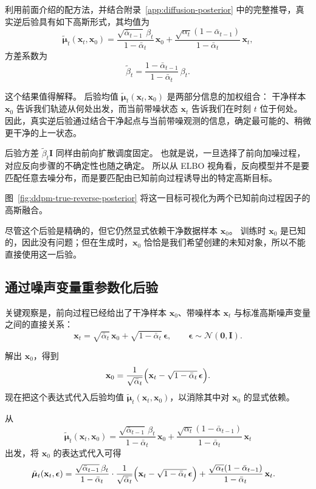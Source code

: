 利用前面介绍的配方法，并结合附录~\ref{app:diffusion-posterior} 中的完整推导，真实逆后验具有如下高斯形式，其均值为
\[
\tilde{\boldsymbol{\mu}}_t(\mathbf{x}_t,\mathbf{x}_0)
=
\frac{
\sqrt{\bar{\alpha}_{t-1}}\,\beta_t
}{
1-\bar{\alpha}_t
}\,\mathbf{x}_0
+
\frac{
\sqrt{\alpha_t}(1-\bar{\alpha}_{t-1})
}{
1-\bar{\alpha}_t
}\,\mathbf{x}_t,
\]
方差系数为
\[
\tilde{\beta}_t
=
\frac{
1-\bar{\alpha}_{t-1}
}{
1-\bar{\alpha}_t
}\,\beta_t.
\]

这个结果值得解释。
后验均值
$\tilde{\boldsymbol{\mu}}_t(\mathbf{x}_t,\mathbf{x}_0)$
是两部分信息的加权组合：
干净样本 $\mathbf{x}_0$ 告诉我们轨迹从何处出发，而当前带噪状态 $\mathbf{x}_t$ 告诉我们在时刻 $t$ 位于何处。
因此，真实逆后验通过结合干净起点与当前带噪观测的信息，确定最可能的、稍微更干净的上一状态。

后验方差 $\tilde{\beta}_t\mathbf{I}$ 同样由前向扩散调度固定。
也就是说，一旦选择了前向加噪过程，对应反向步骤的不确定性也随之确定。
所以从 ELBO 视角看，反向模型并不是要匹配任意去噪分布，而是要匹配由已知前向过程诱导出的特定高斯目标。

图~\ref{fig:ddpm-true-reverse-posterior} 将这一目标可视化为两个已知前向过程因子的高斯融合。



尽管这个后验是精确的，但它仍然显式依赖干净数据样本 $\mathbf{x}_0$。
训练时 $\mathbf{x}_0$ 是已知的，因此没有问题；但在生成时，$\mathbf{x}_0$ 恰恰是我们希望创建的未知对象，所以不能直接使用这一后验。

\subsection{通过噪声变量重参数化后验}

关键观察是，前向过程已经给出了干净样本 $\mathbf{x}_0$、带噪样本 $\mathbf{x}_t$ 与标准高斯噪声变量之间的直接关系：
\[
\mathbf{x}_t
=
\sqrt{\bar{\alpha}_t}\,\mathbf{x}_0
+
\sqrt{1-\bar{\alpha}_t}\,\boldsymbol{\epsilon},
\qquad
\boldsymbol{\epsilon}\sim \mathcal{N}(\mathbf{0},\mathbf{I}).
\]

解出 $\mathbf{x}_0$，得到
\[
\mathbf{x}_0
=
\frac{1}{\sqrt{\bar{\alpha}_t}}
\Bigl(
\mathbf{x}_t-\sqrt{1-\bar{\alpha}_t}\,\boldsymbol{\epsilon}
\Bigr).
\]
现在把这个表达式代入后验均值
$\tilde{\boldsymbol{\mu}}_t(\mathbf{x}_t,\mathbf{x}_0)$，以消除其中对 $\mathbf{x}_0$ 的显式依赖。

从
\[
\tilde{\boldsymbol{\mu}}_t(\mathbf{x}_t,\mathbf{x}_0)
=
\frac{
\sqrt{\bar{\alpha}_{t-1}}\,\beta_t
}{
1-\bar{\alpha}_t
}\,\mathbf{x}_0
+
\frac{
\sqrt{\alpha_t}(1-\bar{\alpha}_{t-1})
}{
1-\bar{\alpha}_t
}\,\mathbf{x}_t
\]
出发，将 $\mathbf{x}_0$ 的表达式代入可得
\[
\begin{aligned}
\tilde{\boldsymbol{\mu}}_t(\mathbf{x}_t,\boldsymbol{\epsilon})
&=
\frac{
\sqrt{\bar{\alpha}_{t-1}}\,\beta_t
}{
1-\bar{\alpha}_t
}
\cdot
\frac{1}{\sqrt{\bar{\alpha}_t}}
\Bigl(
\mathbf{x}_t-\sqrt{1-\bar{\alpha}_t}\,\boldsymbol{\epsilon}
\Bigr)
+
\frac{
\sqrt{\alpha_t}(1-\bar{\alpha}_{t-1})
}{
1-\bar{\alpha}_t
}\,\mathbf{x}_t.
\end{aligned}
\]

